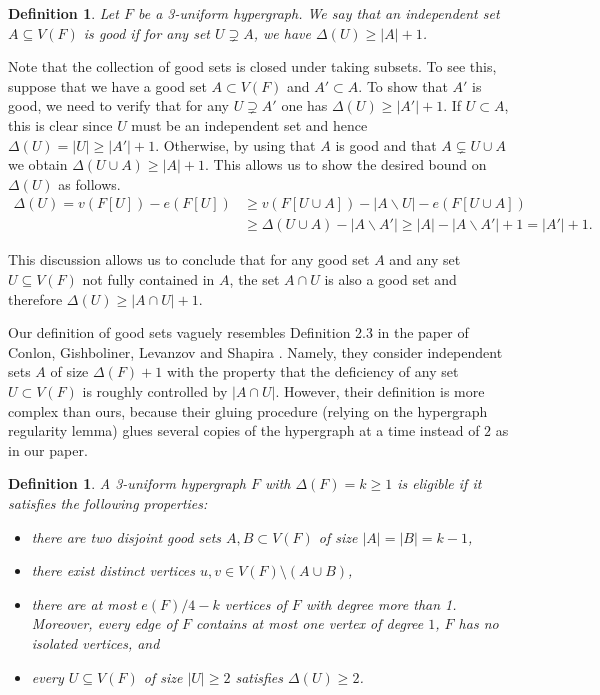 \documentclass[11pt]{article}
\numberwithin{equation}{section}
\theoremstyle{plain}
\newtheorem{definition}[theorem]{Definition}
\theoremstyle{remark}
\begin{document}
\begin{definition}\label{defn:good}
Let $F$ be a 3-uniform hypergraph. We say that an independent set $A\subseteq V(F)$ is \textit{good} if for any set $U\supsetneq A$, we have $\Delta(U)\geq |A|+1$.
\end{definition}

\noindent
Note that the collection of good sets is closed under taking subsets. To see this, suppose that we have a good set $A\subset V(F)$ and $A'\subset A$. To show that $A'$ is good, we need to verify that for any $U\supsetneq A'$ one has $\Delta(U)\geq |A'|+1$. If $U\subset A$, this is clear since $U$ must be an independent set and hence $\Delta(U)=|U|\geq |A'|+1$. Otherwise, by using that $A$ is good and that $A\subsetneq U\cup A$ we obtain $\Delta(U\cup A)\geq |A|+1$. This allows us to show the desired bound on $\Delta(U)$ as follows.
\begin{align*}
    \Delta(U)=v(F[U])-e(F[U])&\geq v(F[U\cup A])-|A\backslash U|-e(F[U\cup A])\\
    &\geq \Delta(U\cup A)-|A\backslash A'|\geq |A|-|A\backslash A'|+1=|A'|+1.
\end{align*}

This discussion allows us to conclude that for any good set $A$ and any set $U\subseteq V(F)$ not fully contained in $A$, the set $A\cap U$ is also a good set and therefore $\Delta(U)\geq |A\cap U|+1$. 

Our definition of good sets vaguely resembles Definition 2.3 in the paper of Conlon, Gishboliner, Levanzov and Shapira \cite{CGLS23}. Namely, they consider independent sets $A$ of size $\Delta(F)+1$ with the property that the deficiency of any set $U\subset V(F)$ is roughly controlled by $|A\cap U|$. However, their definition is more complex than ours, because their gluing procedure (relying on the hypergraph regularity lemma) glues several copies of the hypergraph at a time instead of $2$ as in our paper.

\begin{definition}\label{defn:eligible}
A 3-uniform hypergraph $F$ with $\Delta(F)=k\geq 1$ is \textit{eligible} if it satisfies the following properties:
\begin{itemize}
    \item[(i)] there are two disjoint good sets $A, B\subset V(F)$ of size $|A|=|B|=k-1$,
    \item[(ii)] there exist distinct vertices $u, v \in V(F) \setminus (A \cup B)$,
    \item[(iii)] there are at most $e(F)/4-k$ vertices of $F$ with degree more than 1. Moreover, every edge of $F$ contains at most one vertex of degree $1$, $F$ has no isolated vertices, and
    \item[(iv)] every $U\subseteq V(F)$ of size $|U|\geq 2$ satisfies $\Delta(U)\geq 2$.
\end{itemize}
\end{definition}
\end{document}

